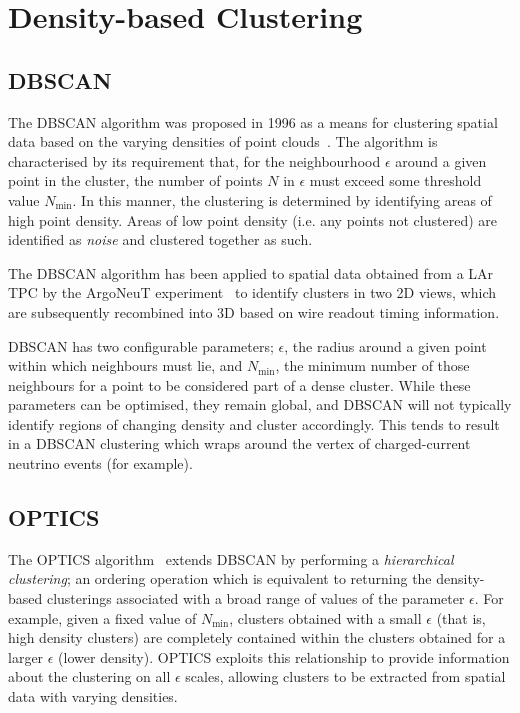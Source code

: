 \section{Density-based Clustering}
\subsection{\acs{DBSCAN}}\label{sec:latte_dbscan}
The \ac{DBSCAN} algorithm was proposed in 1996 as a means for clustering spatial data based on the varying densities of point clouds~\citep{Ester1996}. The algorithm is characterised by its requirement that, for the neighbourhood $\epsilon$ around a given point in the cluster, the number of points $N$ in $\epsilon$ must exceed some threshold value $N_\mathrm{min}$. In this manner, the clustering is determined by identifying areas of high point density. Areas of low point density (i.e. any points not clustered) are identified as \emph{noise} and clustered together as such.

The \ac{DBSCAN} algorithm has been applied to spatial data obtained from a \ac{LAr TPC} by the ArgoNeuT experiment~\cite{Spitz2011} to identify clusters in two 2D views, which are subsequently recombined into 3D based on wire readout timing information.

\ac{DBSCAN} has two configurable parameters; $\epsilon$, the radius around a given point within which neighbours must lie, and $N_\mathrm{min}$, the minimum number of those neighbours for a point to be considered part of a dense cluster. While these parameters can be optimised, they remain global, and \ac{DBSCAN} will not typically identify regions of changing density and cluster accordingly. This tends to result in a \ac{DBSCAN} clustering which wraps around the vertex of charged-current neutrino events (for example).

\subsection{\acs{OPTICS}}
The \ac{OPTICS} algorithm~\citep{Ankerst1999} extends \ac{DBSCAN} by performing a \emph{hierarchical clustering}; an ordering operation which is equivalent to returning the density-based clusterings associated with a broad range of values of the parameter $\epsilon$. For example, given a fixed value of $N_\mathrm{min}$, clusters obtained with a small $\epsilon$ (that is, high density clusters) are completely contained within the clusters obtained for a larger $\epsilon$ (lower density). \ac{OPTICS} exploits this relationship to provide information about the clustering on all $\epsilon$ scales, allowing clusters to be extracted from spatial data with varying densities.

